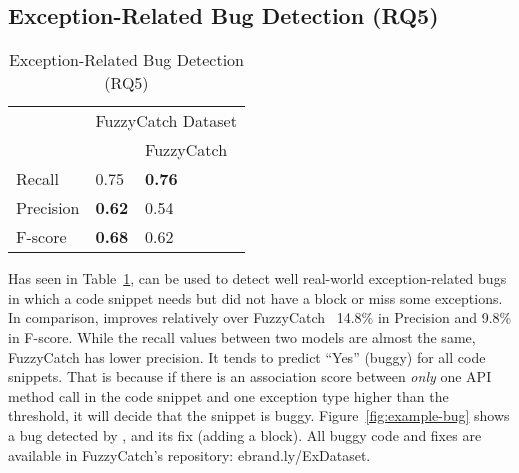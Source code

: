 \subsection{Exception-Related Bug Detection (RQ5)}
\label{sec:rq1}

\begin{table}[t]%
  \caption {Exception-Related Bug Detection (RQ5)}
  \vspace{-12pt}
  \small
	\begin{center}
		\renewcommand{\arraystretch}{1}
		\begin{tabular}{|p{1.75cm}<{\centering}|p{1.75cm}<{\centering}|p{1.75cm}<{\centering}|}
		  \hline
			\multirow{2}{*}{} & \multicolumn{2}{c|}{FuzzyCatch Dataset} \\
			\cline{2-3}
			  & \tool  & FuzzyCatch~\cite{xrank-fse20} \\
			\hline
			Recall    & 0.75 & \textbf{0.76}\\
			Precision & \textbf{0.62} & 0.54\\
			F-score   & \textbf{0.68} & 0.62\\
			\hline
		\end{tabular}
		\label{tab:bug}
	\end{center}
\end{table}



Has seen in Table~\ref{tab:bug}, {\tool} can be used to detect well
real-world exception-related bugs in which a code snippet needs but
did not have a  block or miss some exceptions. In
comparison, {\tool} improves relatively over
FuzzyCatch~\cite{xrank-fse20} 14.8\% in Precision and
9.8\% in F-score.
While the recall values between two models are almost the same,
FuzzyCatch has lower precision. It tends to predict ``Yes'' (buggy)
for all code snippets. That is because if there is an association
score between {\em only} one API method call in the code snippet and
one exception type higher than the threshold, it will decide that the
snippet is buggy. Figure~\ref{fig:example-bug} shows a bug detected by
{\tool}, and its fix (adding a  block). All buggy code
and fixes are available in FuzzyCatch's repository:
ebrand.ly/ExDataset.




